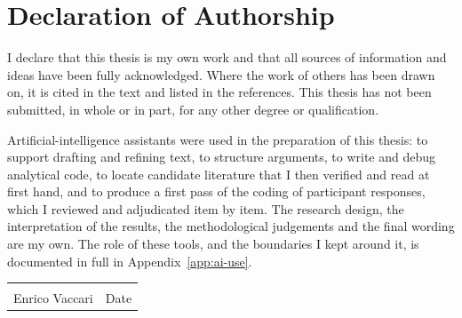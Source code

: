 \chapter*{Declaration of Authorship}

I declare that this thesis is my own work and that all sources of information and ideas have
been fully acknowledged. Where the work of others has been drawn on, it is cited in the text
and listed in the references. This thesis has not been submitted, in whole or in part, for
any other degree or qualification.

Artificial-intelligence assistants were used in the preparation of this thesis: to support
drafting and refining text, to structure arguments, to write and debug analytical code, to
locate candidate literature that I then verified and read at first hand, and to produce a
first pass of the coding of participant responses, which I reviewed and adjudicated item by
item. The research design, the interpretation of the results, the methodological judgements
and the final wording are my own. The role of these tools, and the boundaries I kept around
it, is documented in full in Appendix~\ref{app:ai-use}.

\vspace{2cm}

\noindent
\begin{tabular}{@{}p{7cm}p{6cm}@{}}
\hrulefill & \hrulefill \\
Enrico Vaccari & Date \\
\end{tabular}

\cleardoublepage
